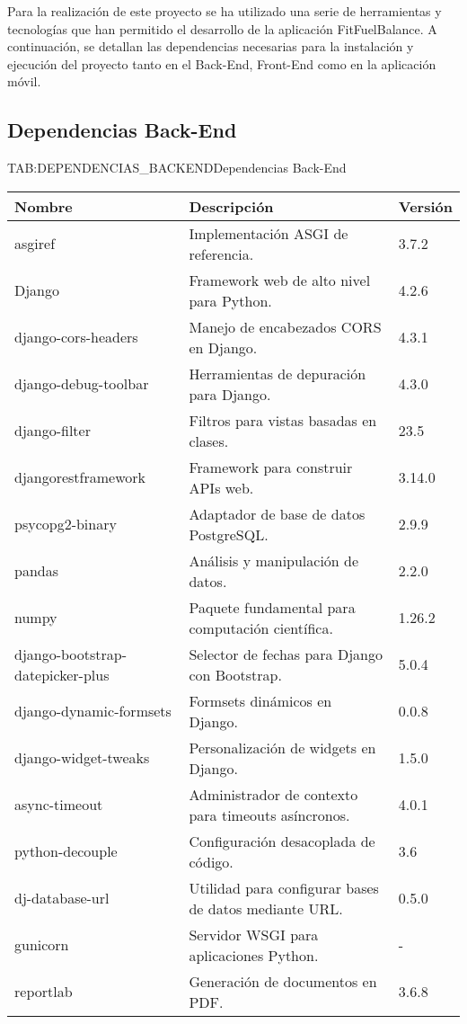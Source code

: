 Para la realización de este proyecto se ha utilizado una serie de herramientas y tecnologías que han permitido el desarrollo de la aplicación FitFuelBalance. A continuación, se detallan las dependencias necesarias para la instalación y ejecución del proyecto tanto en el Back-End, Front-End como en la aplicación móvil.

\subsection{Dependencias Back-End}

\begin{table}[Dependencias Back-End]{TAB:DEPENDENCIAS_BACKEND}{Dependencias Back-End}
  \begin{tabular}{|p{6cm}|p{8cm}|p{2cm}|}
    \hline
    \textbf{Nombre} & \textbf{Descripción} & \textbf{Versión} \\
    \hline
    asgiref & Implementación ASGI de referencia. & 3.7.2 \\
    \hline
    Django & Framework web de alto nivel para Python. & 4.2.6 \\
    \hline
    django-cors-headers & Manejo de encabezados CORS en Django. & 4.3.1 \\
    \hline
    django-debug-toolbar & Herramientas de depuración para Django. & 4.3.0 \\
    \hline
    django-filter & Filtros para vistas basadas en clases. & 23.5 \\
    \hline
    djangorestframework & Framework para construir APIs web. & 3.14.0 \\
    \hline
    psycopg2-binary & Adaptador de base de datos PostgreSQL. & 2.9.9 \\
    \hline
    pandas & Análisis y manipulación de datos. & 2.2.0 \\
    \hline
    numpy & Paquete fundamental para computación científica. & 1.26.2 \\
    \hline
    django-bootstrap-datepicker-plus & Selector de fechas para Django con Bootstrap. & 5.0.4 \\
    \hline
    django-dynamic-formsets & Formsets dinámicos en Django. & 0.0.8 \\
    \hline
    django-widget-tweaks & Personalización de widgets en Django. & 1.5.0 \\
    \hline
    async-timeout & Administrador de contexto para timeouts asíncronos. & 4.0.1 \\
    \hline
    python-decouple & Configuración desacoplada de código. & 3.6 \\
    \hline
    dj-database-url & Utilidad para configurar bases de datos mediante URL. & 0.5.0 \\
    \hline
    gunicorn & Servidor WSGI para aplicaciones Python. & - \\
    \hline
    reportlab & Generación de documentos en PDF. & 3.6.8 \\
    \hline
  \end{tabular}
\end{table}

